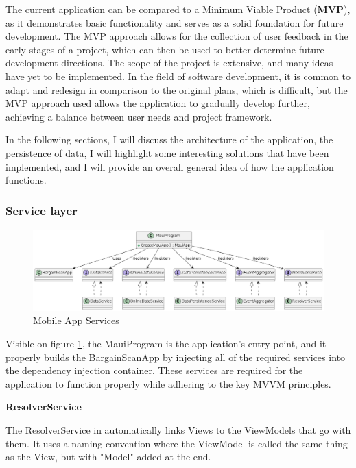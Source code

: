 The current application can be compared to a Minimum Viable Product (\textbf{MVP}), as it demonstrates basic functionality and serves as a solid foundation for future development. The MVP approach allows for the collection of user feedback in the early stages of a project, which can then be used to better determine future development directions. The scope of the project is extensive, and many ideas have yet to be implemented. In the field of software development, it is common to adapt and redesign in comparison to the original plans, which is difficult, but the MVP approach used allows the application to gradually develop further, achieving a balance between user needs and project framework.

In the following sections, I will discuss the architecture of the application, the persistence of data, I will highlight some interesting solutions that have been implemented, and I will provide an overall general idea of how the application functions.

\pagebreak

\subsubsection{Service layer}

\begin{figure}[H]
	\centering
	\includegraphics[width=1\linewidth]{img/app_services.png}
	\caption{Mobile App Services}
	\label{fig:appservices}
\end{figure}

Visible on figure \ref{fig:appservices}, the MauiProgram is the application's entry point, and it properly builds the BargainScanApp by injecting all of the required services into the dependency injection container. These services are required for the application to function properly while adhering to the key MVVM principles.

\noindent\textbf{ResolverService}

The ResolverService in automatically links Views to the ViewModels that go with them. It uses a naming convention where the ViewModel is called the same thing as the View, but with "Model" added at the end.


